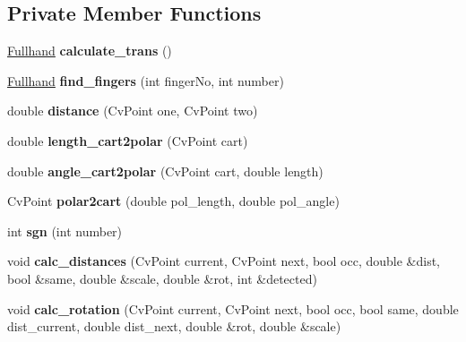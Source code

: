 \subsection*{Private Member Functions}
\begin{DoxyCompactItemize}
\item 
\hypertarget{classTransform_ae339e3972cc3edb6ff8d597f50988499}{
\hyperlink{classFullhand}{Fullhand} {\bfseries calculate\_\-trans} ()}
\label{classTransform_ae339e3972cc3edb6ff8d597f50988499}

\item 
\hypertarget{classTransform_a368fe723e1609e2d89ee56791730425a}{
\hyperlink{classFullhand}{Fullhand} {\bfseries find\_\-fingers} (int fingerNo, int number)}
\label{classTransform_a368fe723e1609e2d89ee56791730425a}

\item 
\hypertarget{classTransform_a181f6ef523d83b6a7bbd2f7d7d605077}{
double {\bfseries distance} (CvPoint one, CvPoint two)}
\label{classTransform_a181f6ef523d83b6a7bbd2f7d7d605077}

\item 
\hypertarget{classTransform_a60d05a42d3eb98010e80d5592fdf899d}{
double {\bfseries length\_\-cart2polar} (CvPoint cart)}
\label{classTransform_a60d05a42d3eb98010e80d5592fdf899d}

\item 
\hypertarget{classTransform_ab3ba5d8788191d546c46dea00a11acf9}{
double {\bfseries angle\_\-cart2polar} (CvPoint cart, double length)}
\label{classTransform_ab3ba5d8788191d546c46dea00a11acf9}

\item 
\hypertarget{classTransform_a9de44b4def5d4ec3e8761fe5586b1387}{
CvPoint {\bfseries polar2cart} (double pol\_\-length, double pol\_\-angle)}
\label{classTransform_a9de44b4def5d4ec3e8761fe5586b1387}

\item 
\hypertarget{classTransform_a192c642eb0e11ff2088b3e5788c3bd04}{
int {\bfseries sgn} (int number)}
\label{classTransform_a192c642eb0e11ff2088b3e5788c3bd04}

\item 
\hypertarget{classTransform_af35d0394b97db2242312a744f40acfb4}{
void {\bfseries calc\_\-distances} (CvPoint current, CvPoint next, bool occ, double \&dist, bool \&same, double \&scale, double \&rot, int \&detected)}
\label{classTransform_af35d0394b97db2242312a744f40acfb4}

\item 
\hypertarget{classTransform_aa8693935ebffb2f823331d8d37fbec3e}{
void {\bfseries calc\_\-rotation} (CvPoint current, CvPoint next, bool occ, bool same, double dist\_\-current, double dist\_\-next, double \&rot, double \&scale)}
\label{classTransform_aa8693935ebffb2f823331d8d37fbec3e}

\end{DoxyCompactItemize}



